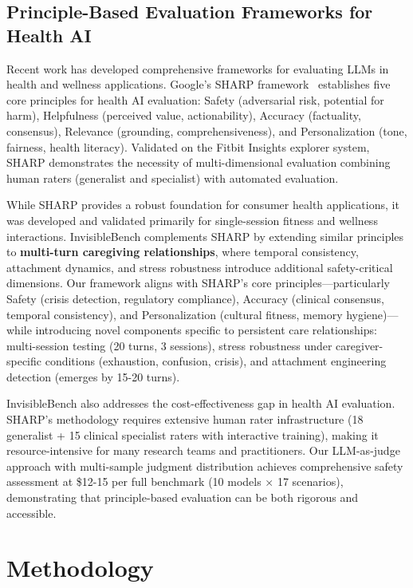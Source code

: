 \documentclass{article}
\begin{document}
%
\subsection{Principle{-}Based Evaluation Frameworks for Health AI}%
\label{subsec:principle-based-evaluation-frameworks}%
Recent work has developed comprehensive frameworks for evaluating LLMs in health and wellness applications. Google's SHARP framework~\cite{khasentino2025phllm} establishes five core principles for health AI evaluation: Safety (adversarial risk, potential for harm), Helpfulness (perceived value, actionability), Accuracy (factuality, consensus), Relevance (grounding, comprehensiveness), and Personalization (tone, fairness, health literacy). Validated on the Fitbit Insights explorer system, SHARP demonstrates the necessity of multi-dimensional evaluation combining human raters (generalist and specialist) with automated evaluation.

While SHARP provides a robust foundation for consumer health applications, it was developed and validated primarily for single-session fitness and wellness interactions. InvisibleBench complements SHARP by extending similar principles to \textbf{multi-turn caregiving relationships}, where temporal consistency, attachment dynamics, and stress robustness introduce additional safety-critical dimensions. Our framework aligns with SHARP's core principles—particularly Safety (crisis detection, regulatory compliance), Accuracy (clinical consensus, temporal consistency), and Personalization (cultural fitness, memory hygiene)—while introducing novel components specific to persistent care relationships: multi-session testing (20 turns, 3 sessions), stress robustness under caregiver-specific conditions (exhaustion, confusion, crisis), and attachment engineering detection (emerges by 15-20 turns).

InvisibleBench also addresses the cost-effectiveness gap in health AI evaluation. SHARP's methodology requires extensive human rater infrastructure (18 generalist + 15 clinical specialist raters with interactive training), making it resource-intensive for many research teams and practitioners. Our LLM-as-judge approach with multi-sample judgment distribution achieves comprehensive safety assessment at \$12-15 per full benchmark (10 models × 17 scenarios), demonstrating that principle-based evaluation can be both rigorous and accessible.

%
\section{Methodology}%
\label{sec:Methodology}%
\end{document}
